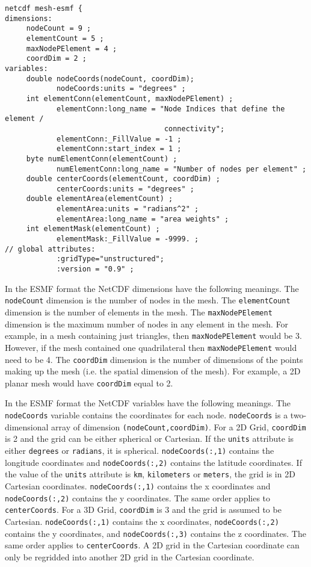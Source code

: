 \begin{verbatim}
netcdf mesh-esmf {
dimensions:
     nodeCount = 9 ;
     elementCount = 5 ;
     maxNodePElement = 4 ;
     coordDim = 2 ;
variables:
     double nodeCoords(nodeCount, coordDim);
            nodeCoords:units = "degrees" ;
     int elementConn(elementCount, maxNodePElement) ;
            elementConn:long_name = "Node Indices that define the element /
                                     connectivity";
            elementConn:_FillValue = -1 ;
            elementConn:start_index = 1 ;
     byte numElementConn(elementCount) ;
            numElementConn:long_name = "Number of nodes per element" ;
     double centerCoords(elementCount, coordDim) ;
            centerCoords:units = "degrees" ;
     double elementArea(elementCount) ;
            elementArea:units = "radians^2" ;
            elementArea:long_name = "area weights" ;
     int elementMask(elementCount) ;
            elementMask:_FillValue = -9999. ;
// global attributes:
            :gridType="unstructured";
            :version = "0.9" ;
\end{verbatim}

 In the ESMF format the NetCDF dimensions have the following meanings. The {\tt nodeCount} dimension is the number of nodes in the mesh.
 The {\tt elementCount} dimension is the number of elements in the mesh. The {\tt maxNodePElement} dimension is the maximum number
 of nodes in any element in the mesh. For example, in a mesh containing just triangles, then {\tt maxNodePElement} would be 3. However,
 if the mesh contained one quadrilateral then {\tt maxNodePElement} would need to be 4. The {\tt coordDim} dimension is the number of dimensions
 of the points making up the mesh (i.e. the spatial dimension of the mesh). For example, a 2D planar mesh would have {\tt coordDim} equal to 2.  

 In the ESMF format the NetCDF variables have the following meanings. The {\tt nodeCoords} variable contains the coordinates for each node.
 {\tt nodeCoords} is a two-dimensional array of dimension {\tt (nodeCount,coordDim)}.
 For a 2D Grid, {\tt coordDim} is 2 and the grid can be either spherical or Cartesian. If the {\tt units}
 attribute is either {\tt degrees} or {\tt radians}, it is spherical. {\tt nodeCoords(:,1)} contains 
the longitude coordinates and {\tt nodeCoords(:,2)} contains the latitude coordinates.  If the value of 
the {\tt units} attribute is {\tt km}, {\tt kilometers} or {\tt meters}, the grid is in 2D Cartesian 
coordinates. {\tt nodeCoords(:,1)} contains the x coordinates and
 {\tt nodeCoords(:,2)} contains the y coordinates.
 The same order applies to {\tt centerCoords}.
 For a 3D Grid, {\tt coordDim} is 3 and the grid is assumed to be Cartesian. {\tt nodeCoords(:,1)} contains the x coordinates, {\tt nodeCoords(:,2)} contains the y coordinates, 
 and {\tt nodeCoords(:,3)} contains the z coordinates.  The same order applies to {\tt centerCoords}.
A 2D grid in the Cartesian coordinate can only be regridded into another 2D grid in the Cartesian coordinate.
 
